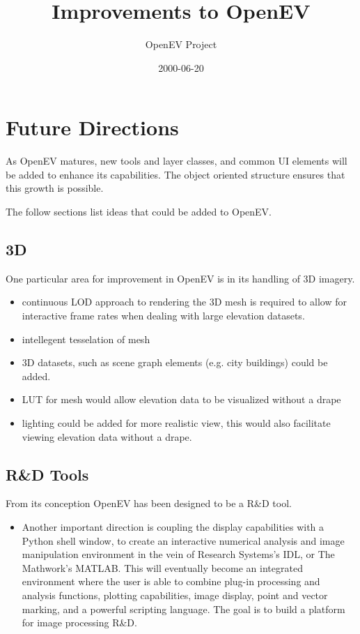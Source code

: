 \documentclass{article}
\begin{document}
\title{Improvements to OpenEV}
\date{2000-06-20}
\author{OpenEV Project}
\maketitle

\section{Future Directions}

As OpenEV matures, new tools and layer classes, and common UI elements
will be added to enhance its capabilities.  The object oriented
structure ensures that this growth is possible.

The follow sections list ideas that could be added to OpenEV.

\subsection{3D}

One particular area for improvement in OpenEV is in its handling of 3D imagery.

\begin{itemize}
\item continuous LOD approach to rendering the 3D mesh is required to allow for
interactive frame rates when dealing with large elevation datasets.
\item intellegent tesselation of mesh
\item 3D datasets, such as scene graph elements (e.g. city buildings) could be added.
\item LUT for mesh would allow elevation data to be visualized without a drape
\item lighting could be added for more realistic view, this would also facilitate viewing
elevation data without a drape.
\end{itemize}


\subsection{R\&D Tools}

From its conception OpenEV has been designed to be a R\&D tool.  

\begin{itemize}
\item Another important direction is coupling the display capabilities with
a Python shell window, to create an interactive numerical analysis and
image manipulation environment in the vein of Research Systems's IDL,
or The Mathwork's MATLAB.  This will eventually become an integrated
environment where the user is able to combine plug-in processing and
analysis functions, plotting capabilities, image display, point and
vector marking, and a powerful scripting language.  The goal is to
build a platform for image processing R\&D.
\end{itemize}
\end{document}
